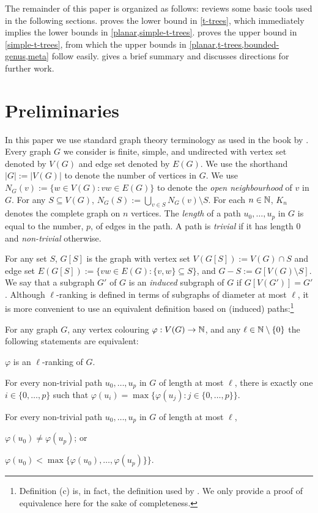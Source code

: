\documentclass[kpfonts]{patmorin}
\theoremstyle{named}
\begin{document}
The remainder of this paper is organized as follows:  reviews some basic tools used in the following sections.    proves the lower bound in \cref{t-trees}, which immediately implies the lower bounds in \cref{planar,simple-t-trees}.  proves the upper bound in \cref{simple-t-trees}, from which the upper bounds in \cref{planar,t-trees,bounded-genus,meta} follow easily.   gives a brief summary and discusses directions for further work.

\section{Preliminaries}

In this paper we use standard graph theory terminology as used in the book by \citet{diestel:graph}.  Every graph $G$ we consider is finite, simple, and undirected with vertex set denoted by $V(G)$ and edge set denoted by $E(G)$.  We use the shorthand $|G|:=|V(G)|$ to denote the number of vertices in $G$.  We use $N_G(v):=\{w\in V(G): vw\in E(G)\}$ to denote the \emph{open neighbourhood} of $v$ in $G$. For any $S\subseteq V(G)$, $N_G(S):=\bigcup_{v\in S} N_G(v)\setminus S$.  For each $n\in\mathbb{N}$, $K_n$ denotes the complete graph on $n$ vertices.  The \emph{length} of a path $u_0,\ldots,u_p$ in $G$ is equal to the number, $p$, of edges in the path. A path is \emph{trivial} if it has length 0 and \emph{non-trivial} otherwise.

For any set $S$, $G[S]$ is the graph with vertex set $V(G[S]):=V(G)\cap S$ and edge set $E(G[S]):=\{vw\in E(G): \{v,w\}\subseteq S\}$, and $G-S:=G[V(G)\setminus S]$.  We say that a subgraph $G'$ of $G$ is an \emph{induced} subgraph of $G$ if $G[V(G')]=G'$.  Although $\ell$-ranking is defined in terms of subgraphs of diameter at most $\ell$, it is more convenient to use an equivalent definition based on (induced) paths:\footnote{Definition (c) is, in fact, the definition used by \citet{karpas.neiman.ea:on}. We only provide a proof of equivalence here for the sake of completeness.}

\begin{obs}
  For any graph $G$, any vertex colouring $\varphi:V(G)\to\mathbb{N}$, and any $\ell\in\mathbb{N}\setminus\{0\}$ the following statements are equivalent:
  \begin{compactenum}[(a)]
    \item $\varphi$ is an $\ell$-ranking of $G$.
    \item For every non-trivial path $u_0,\ldots,u_p$ in $G$ of length at most $\ell$, there is exactly one $i\in\{0,\ldots,p\}$ such that $\varphi(u_i)=\max\{\varphi(u_j):j\in\{0,\ldots,p\}\}$.
    \item For every non-trivial path $u_0,\ldots,u_p$ in $G$ of length at most $\ell$,
  \begin{inparaenum}[(i)]
    \item $\varphi(u_0)\neq\varphi(u_p)$; or \item $\varphi(u_0)<\max\{\varphi(u_0),\ldots,\varphi(u_p)\}\}$.
  \end{inparaenum}
  \end{compactenum}
\end{obs}
\end{document}
